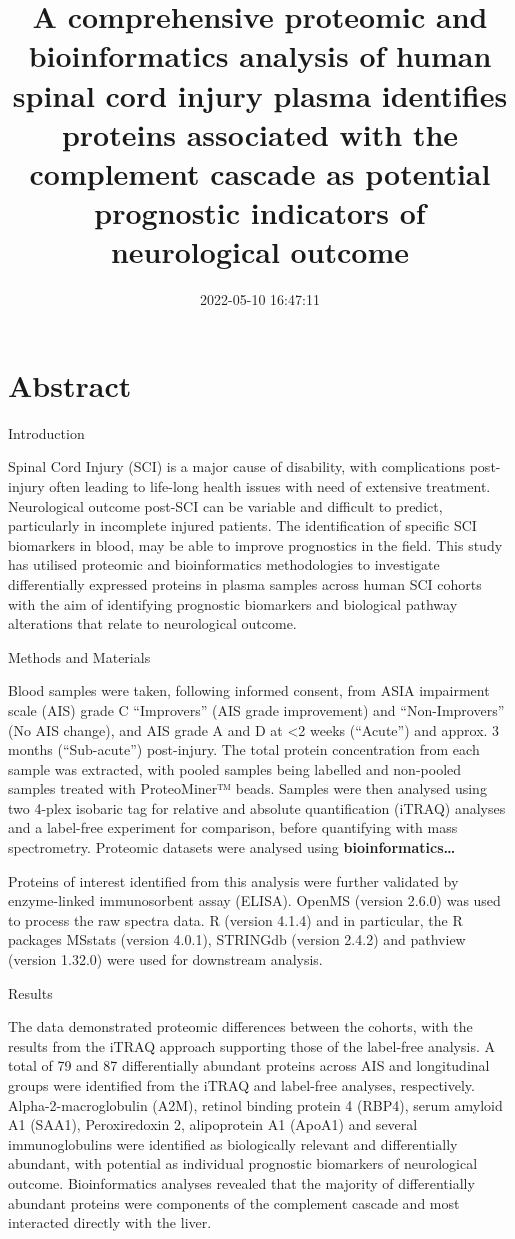 \documentclass[9pt,lineno]{elife}
\title{A comprehensive proteomic and bioinformatics analysis of human spinal cord injury plasma identifies proteins associated with the complement cascade as potential prognostic indicators of neurological outcome}
\author{}
\date{2022-05-10 16:47:11}
\begin{document}
\maketitle

\hypertarget{abstract}{%
\section{Abstract}\label{abstract}}

Introduction

Spinal Cord Injury (SCI) is a major cause of disability, with complications post-injury often leading to life-long health issues with need of extensive treatment. Neurological outcome post-SCI can be variable and difficult to predict, particularly in incomplete injured patients. The identification of specific SCI biomarkers in blood, may be able to improve prognostics in the field. This study has utilised proteomic and bioinformatics methodologies to investigate differentially expressed proteins in plasma samples across human SCI cohorts with the aim of identifying prognostic biomarkers and biological pathway alterations that relate to neurological outcome.

Methods and Materials

Blood samples were taken, following informed consent, from ASIA impairment scale (AIS) grade C ``Improvers'' (AIS grade improvement) and ``Non-Improvers'' (No AIS change), and AIS grade A and D at \textless2 weeks (``Acute'') and approx. 3 months (``Sub-acute'') post-injury. The total protein concentration from each sample was extracted, with pooled samples being labelled and non-pooled samples treated with ProteoMiner™ beads. Samples were then analysed using two 4-plex isobaric tag for relative and absolute quantification (iTRAQ) analyses and a label-free experiment for comparison, before quantifying with mass spectrometry. Proteomic datasets were analysed using \textbf{bioinformatics\ldots{}}

Proteins of interest identified from this analysis were further validated by enzyme-linked immunosorbent assay (ELISA).
OpenMS (version 2.6.0) was used to process the raw spectra data.
R (version 4.1.4) and in particular, the R packages MSstats (version 4.0.1), STRINGdb (version 2.4.2) and pathview (version 1.32.0) were used for downstream analysis.

Results

The data demonstrated proteomic differences between the cohorts, with the results from the iTRAQ approach supporting those of the label-free analysis. A total of 79 and 87 differentially abundant proteins across AIS and longitudinal groups were identified from the iTRAQ and label-free analyses, respectively. Alpha-2-macroglobulin (A2M), retinol binding protein 4 (RBP4), serum amyloid A1 (SAA1), Peroxiredoxin 2, alipoprotein A1 (ApoA1) and several immunoglobulins were identified as biologically relevant and differentially abundant, with potential as individual prognostic biomarkers of neurological outcome. Bioinformatics analyses revealed that the majority of differentially abundant proteins were components of the complement cascade and most interacted directly with the liver.
\end{document}
